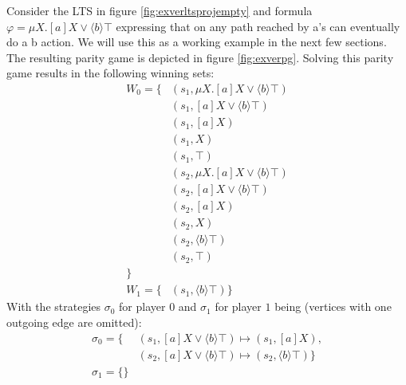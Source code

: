 Consider the LTS in figure \ref{fig:exverltsprojempty} and formula $\varphi = \mu X.[a]X \vee \langle b \rangle \top$ expressing that on any path reached by a's can eventually do a b action. We will use this as a working example in the next few sections. The resulting parity game is depicted in figure \ref{fig:exverpg}. Solving this parity game results in the following winning sets:
\begin{align*}
W_0 = \{& (s_1, \mu X.[a]X \vee \langle b \rangle \top)\\
& (s_1, [a]X \vee \langle b \rangle \top)\\
& (s_1, [a]X)\\
& (s_1, X)\\
& (s_1, \top)\\
& (s_2, \mu X.[a]X \vee \langle b \rangle \top)\\
& (s_2, [a]X \vee \langle b \rangle \top)\\
& (s_2, [a]X)\\
& (s_2, X)\\
& (s_2, \langle b \rangle \top)\\
& (s_2, \top)\\
 \}\\
W_1 = \{& (s_1, \langle b \rangle \top )\}
\end{align*}
With the strategies $\sigma_0$ for player $0$ and $\sigma_1$ for player $1$ being (vertices with one outgoing edge are omitted):
\begin{align*}
\sigma_0 = \{
&(s_1, [a]X \vee \langle b \rangle \top) \mapsto (s_1, [a] X), \\
&(s_2, [a]X \vee \langle b \rangle \top) \mapsto (s_2, \langle b \rangle \top) \} \\
\sigma_1 = \{\} \\
\end{align*}
